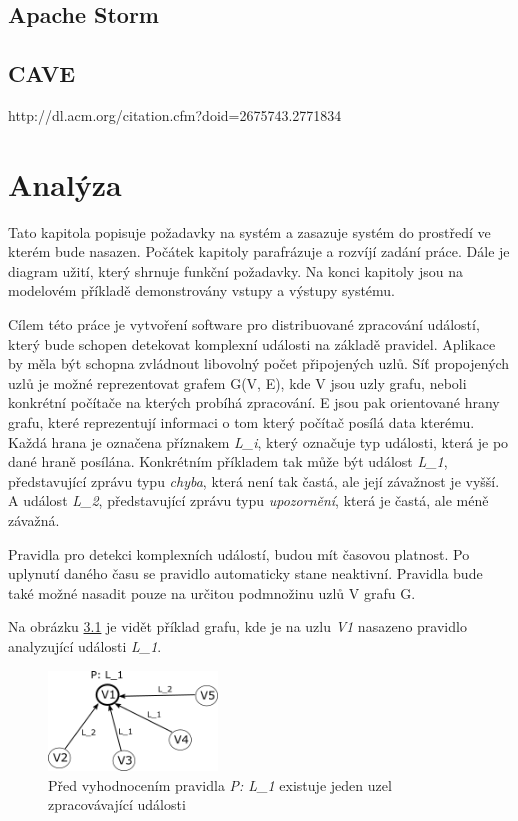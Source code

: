\documentclass[
  digital, %
  table,   %
  nolof,     %
  nolot,     %
  twoside, %
  nocover,
  monochrome,
  12pt
]{fithesis3}
\begin{document}
\section{Apache Storm}
\section{CAVE}
http://dl.acm.org/citation.cfm?doid=2675743.2771834
\chapter{Analýza}
\label{sec:analysis}

Tato kapitola popisuje požadavky na systém a zasazuje systém do prostředí ve kterém bude nasazen. Počátek kapitoly parafrázuje a rozvíjí zadání práce. Dále je diagram užití, který shrnuje funkční požadavky. Na konci kapitoly jsou na modelovém příkladě demonstrovány vstupy a výstupy systému.

Cílem této práce je vytvoření software pro distribuované zpracování událostí, který bude schopen detekovat komplexní události na základě pravidel. Aplikace by měla být schopna zvládnout libovolný počet připojených uzlů. Síť propojených uzlů je možné reprezentovat grafem G(V, E), kde V jsou uzly grafu, neboli konkrétní počítače na kterých probíhá zpracování. E jsou pak orientované hrany grafu, které reprezentují informaci o tom který počítač posílá data kterému. Každá hrana je označena příznakem \textit{L\_i}, který označuje typ události, která je po dané hraně posílána. Konkrétním příkladem tak může být událost \textit{L\_1}, představující zprávu typu \textit{chyba}, která není tak častá, ale její závažnost je vyšší. A událost \textit{L\_2}, představující zprávu typu \textit{upozornění}, která je častá, ale méně závažná.

Pravidla pro detekci komplexních událostí, budou mít časovou platnost. Po uplynutí daného času se pravidlo automaticky stane neaktivní. Pravidla bude také možné nasadit pouze na určitou podmnožinu uzlů V grafu G. 

Na obrázku \ref{fig:analysis_case_1} je vidět příklad grafu, kde je na uzlu \textit{V1} nasazeno pravidlo analyzující události \textit{L\_1}.

\begin{figure}[H]
	\centering
    \includegraphics[width=0.4\textwidth, height=0.15\textheight]{images/analysis_case_1.png}
    \caption{Před vyhodnocením pravidla \textit{P: L\_1} existuje jeden uzel zpracovávající události}
    \label{fig:analysis_case_1}
\end{figure}
\end{document}
